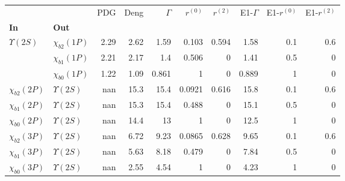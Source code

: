 \begin{tabular}{l|l|r|r|r|r|r|r|r|r}
\toprule
                &                &  PDG &  Deng &  $\Gamma$ &  $r^{(0)}$ &  $r^{(2)}$ &  E1-$\Gamma$ &  E1-$r^{(0)}$ &  E1-$r^{(2)}$ \\
\textbf{In} & \textbf{Out} &      &       &           &            &            &              &               &               \\
\midrule
\textbf{$\Upsilon(2S)$} & \textbf{$\chi_{b2}(1P)$} & 2.29 &  2.62 &      1.59 &      0.103 &      0.594 &         1.58 &           0.1 &           0.6 \\
                & \textbf{$\chi_{b1}(1P)$} & 2.21 &  2.17 &       1.4 &      0.506 &          0 &         1.41 &           0.5 &             0 \\
                & \textbf{$\chi_{b0}(1P)$} & 1.22 &  1.09 &     0.861 &          1 &          0 &        0.889 &             1 &             0 \\
\textbf{$\chi_{b2}(2P)$} & \textbf{$\Upsilon(2S)$} &  nan &  15.3 &      15.4 &     0.0921 &      0.616 &         15.8 &           0.1 &           0.6 \\
\textbf{$\chi_{b1}(2P)$} & \textbf{$\Upsilon(2S)$} &  nan &  15.3 &      15.4 &      0.488 &          0 &         15.1 &           0.5 &             0 \\
\textbf{$\chi_{b0}(2P)$} & \textbf{$\Upsilon(2S)$} &  nan &  14.4 &        13 &          1 &          0 &         12.5 &             1 &             0 \\
\textbf{$\chi_{b2}(3P)$} & \textbf{$\Upsilon(2S)$} &  nan &  6.72 &      9.23 &     0.0865 &      0.628 &         9.65 &           0.1 &           0.6 \\
\textbf{$\chi_{b1}(3P)$} & \textbf{$\Upsilon(2S)$} &  nan &  5.63 &      8.18 &      0.479 &          0 &         7.84 &           0.5 &             0 \\
\textbf{$\chi_{b0}(3P)$} & \textbf{$\Upsilon(2S)$} &  nan &  2.55 &      4.54 &          1 &          0 &         4.23 &             1 &             0 \\
\bottomrule
\end{tabular}
